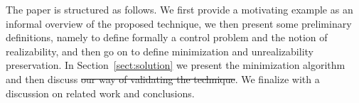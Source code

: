 The paper is structured as follows. We first provide a motivating example as an informal 
overview of the proposed technique, we then present some preliminary definitions, 
namely to define formally a control problem and the notion of realizability, and then go 
on to define minimization and unrealizability preservation. In 
Section~\ref{sect:solution} we present the minimization algorithm and then discuss 
\sout{our way of validating the technique}. We finalize with a discussion on 
related work and conclusions.
%
%
%
%
%
%
